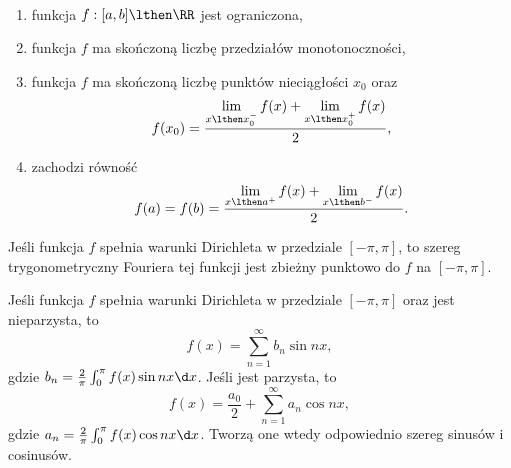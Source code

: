 \begin{definition} ~
    \begin{enumerate}
        \item funkcja $f : [a, b] \lthen \RR$ jest ograniczona,
        \item funkcja $f$ ma skończoną liczbę przedziałów monotonoczności,
        \item funkcja $f$ ma skończoną liczbę punktów nieciągłości $x_0$ oraz
        \[ f(x_0) = \frac{\lim\limits_{x\lthen x_0^-}f(x) + \lim\limits_{x\lthen x_0^+}f(x)}{2}, \]
        \item zachodzi równość
        \[ f(a) = f(b) = \frac{\lim\limits_{x\lthen a^+}f(x) + \lim\limits_{x\lthen b^-}f(x)}{2}. \]
    \end{enumerate}
\end{definition}

\begin{theorem}
    Jeśli funkcja $f$ spełnia warunki Dirichleta w przedziale $[-\pi, \pi]$, to szereg trygonometryczny Fouriera tej funkcji jest zbieżny punktowo do $f$ na $[-\pi, \pi]$.
\end{theorem}

\begin{remark}
    Jeśli funkcja $f$ spełnia warunki Dirichleta w przedziale $[-\pi, \pi]$ oraz jest nieparzysta, to
    \[ f(x) = \sum_{n=1}^\infty b_n\sin nx, \]
    gdzie $b_n = \frac{2}{\pi}\int_0^\pi f(x)\sin nx \d x$. Jeśli jest parzysta, to
    \[ f(x) = \frac{a_0}{2} + \sum_{n=1}^\infty a_n\cos nx, \]
    gdzie $a_n = \frac{2}{\pi}\int_0^\pi f(x)\cos nx \d x$. Tworzą one wtedy odpowiednio szereg sinusów i cosinusów.
\end{remark}

